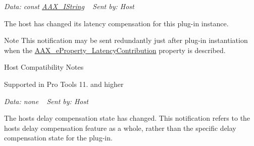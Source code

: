 \begin{Desc}
\begin{description}
{\itshape Data\+: {\ttfamily const} \hyperlink{a00113}{A\+A\+X\+\_\+\+I\+String}} ~\newline
 {\itshape Sent by\+: Host} \item[{\em 
\hypertarget{a00206_afab5ea2cfd731fc8f163b6caa685406ea06ab4b075ecb523d0dde3ec19b76a756}{}A\+A\+X\+\_\+e\+Notification\+Event\+\_\+\+Signal\+Latency\+Changed\label{a00206_afab5ea2cfd731fc8f163b6caa685406ea06ab4b075ecb523d0dde3ec19b76a756}
}]The host has changed its latency compensation for this plug-\/in instance. \begin{DoxyNote}{Note}
This notification may be sent redundantly just after plug-\/in instantiation when the \hyperlink{a00283_a6571f4e41a5dd06e4067249228e2249eaa9037ffd2caf892bafe8f7f170548cb4}{A\+A\+X\+\_\+e\+Property\+\_\+\+Latency\+Contribution} property is described.
\end{DoxyNote}
\begin{DoxyRefDesc}{Host Compatibility Notes}
\item[\hyperlink{a00380__compatibility_notes000038}{Host Compatibility Notes}]Supported in Pro Tools 11. and higher\end{DoxyRefDesc}


{\itshape Data\+: none} ~\newline
 {\itshape Sent by\+: Host} \item[{\em 
\hypertarget{a00206_afab5ea2cfd731fc8f163b6caa685406ea3336fd8cb2428399ab640ee91582c626}{}A\+A\+X\+\_\+e\+Notification\+Event\+\_\+\+Delay\+Compensation\+State\label{a00206_afab5ea2cfd731fc8f163b6caa685406ea3336fd8cb2428399ab640ee91582c626}
}]The host\textquotesingle{}s delay compensation state has changed. This notification refers to the host\textquotesingle{}s delay compensation feature as a whole, rather than the specific delay compensation state for the plug-\/in.


\end{description}
\end{Desc}
